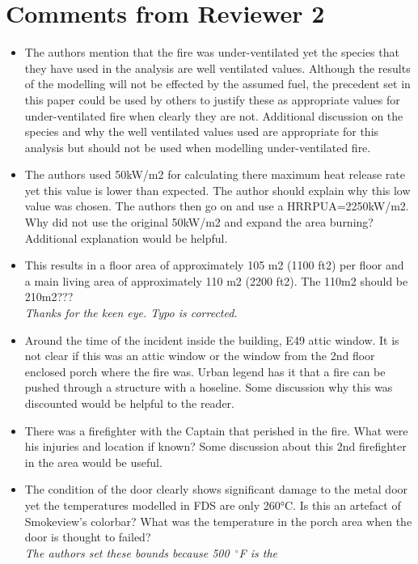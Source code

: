 \documentclass[12pt]{article}
\begin{document}
\section{Comments from Reviewer 2}
\begin{itemize}
 \item The authors mention that the fire was under-ventilated yet the species that they have used in the analysis are well ventilated values.  Although the results of the modelling will not be effected by the assumed fuel, the precedent set in this paper could be used by others to justify these as appropriate values for under-ventilated fire when clearly they are not.  Additional discussion on the species and why the well ventilated values used are appropriate for this analysis but should not be used when modelling under-ventilated fire. 
\item The authors used 50kW/m2 for calculating there maximum heat release rate yet this value is lower than expected.  The author should explain why this low value was chosen.  The authors then go on and use a HRRPUA=2250kW/m2.  Why did not use the original 50kW/m2 and expand the area burning?  Additional explanation would be helpful.
\item This results in a floor area of approximately 105 m2 (1100 ft2) per floor and a main living area of approximately 110 m2 (2200 ft2). 
The 110m2 should be 210m2??? \\
{\it Thanks for the keen eye. Typo is corrected.}
\item  Around the time of the incident inside the building, E49 attic window.  It is not clear if this was an attic window or the window from the 2nd floor enclosed porch where the fire was.  Urban legend has it that a fire can be pushed through a structure with a hoseline.  Some discussion why this was discounted would be helpful to the reader.
\item There was a firefighter with the Captain that perished in the fire.  What were his injuries and location if known?  Some discussion about this 2nd firefighter in the area would be useful.
\item The condition of the door clearly shows significant damage to the metal door yet the temperatures modelled in FDS are only 260°C.   Is this an artefact of Smokeview's colorbar?  What was the temperature in the porch area when the door is thought to failed?\\ {\it The authors set these bounds because 500~$^{\circ}$F is the}
\end{itemize}
\end{document}
